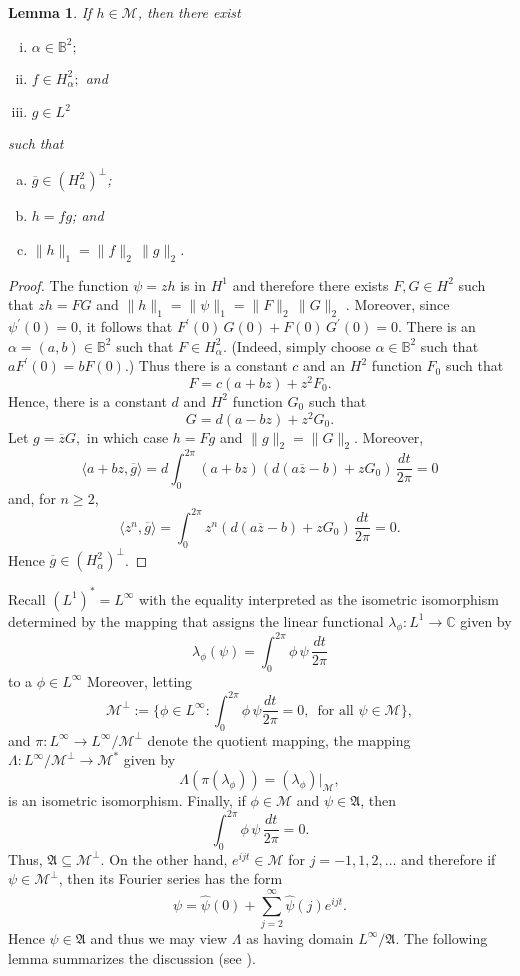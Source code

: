 \documentclass[12pt]{amsart}
\newtheorem{lemma}[theorem]{Lemma}
\theoremstyle{definition}
\theoremstyle{remark}
\numberwithin{equation}{section}
\begin{document}
\begin{lemma}
\label{lem:factor}
 If $h\in \mathscr{M}$, then there exist
\begin{enumerate}[(i)]
\item  $\alpha\in{\mathbb{B}^2};$
\item  $f\in H^2_\alpha;$ and 
\item  $g\in L^2$
\end{enumerate}
such that 
\begin{enumerate}[(a)]
 \item  $\overline{g} \in (H^2_\alpha)^\perp$;
 \item $h=fg$;  and 
 \item $\|h\|_1 =\|f\|_2\, \|g\|_2$.
\end{enumerate}
\end{lemma}

\begin{proof}
 The function $\psi=zh$ is in $H^1$ and therefore there exists $F,G\in H^2$ such that $zh=FG$ and $\|h\|_1 = \|\psi\|_1 = \|F\|_2\, \|G\|_2$ 
\cite[Corollary 6.27]{douglas}.
 Moreover, since $\psi^\prime(0)=0$, it follows that $F^\prime(0)\, G(0)+F(0)\, G^\prime(0)=0$. There is an $\alpha=(a,b)\in {\mathbb{B}^2}$ such that $F\in H^2_\alpha$.
(Indeed, simply choose $\alpha\in {\mathbb{B}^2}$ such that $a F^\prime(0)=bF(0)$.)  Thus there is a constant $c$ and an $H^2$ function $F_0$ such that
\[
 F=c(a+bz) + z^2 F_0.
\]
Hence, there is a constant $d$ and $H^2$ function $G_0$ such that
\[
G=d(a-bz)+z^2 G_0.
\]
Let $g=\overline{z} G,$ in which case $h=Fg$ and $\|g\|_2 =\|G\|_2$. Moreover,
\[
\langle a+bz,\overline{g}\rangle = d {\int_{0}^{2\pi}} (a+bz)\left ( d(a\overline{z}-b) + zG_0\right)\, {\frac{dt}{2\pi}} =0
\]
and, for $n\ge 2$, 
\[
\langle z^n, \overline{g}\rangle ={\int_{0}^{2\pi}} z^n \left(d(a\overline{z}-b)+zG_0\right)\, {\frac{dt}{2\pi}} =0.
\]
Hence $\overline{g}\in (H^2_\alpha)^\perp$.
\end{proof}

Recall   $(L^1)^*=L^\infty$  with the equality interpreted as the isometric isomorphism determined by the mapping that
assigns the linear functional $\lambda_\phi:L^1\to{\mathbb C}$ given by
\[
\lambda_\phi(\psi) = {\int_{0}^{2\pi}} \phi \, \psi \, {\frac{dt}{2\pi}}
\]
to a $\phi\in L^\infty$ 
Moreover, letting 
\[
\mathscr{M}^\perp :=\{\phi\in L^\infty: {\int_{0}^{2\pi}} \phi \, \psi {\frac{dt}{2\pi}} = 0, \, \mbox{ for all } \psi\in \mathscr{M}\},
\]
and $\pi:L^\infty \to L^\infty/\mathscr{M}^\perp$ denote the quotient mapping, 
the mapping $\Lambda:L^\infty/\mathscr{M}^\perp \to \mathscr{M}^*$ given by
\[
 \Lambda(\pi(\lambda_\phi)) = (\lambda_\phi)|_{\mathscr{M}},
\]
is an isometric isomorphism. Finally, if $\phi\in \mathscr{M}$ and $\psi\in {\mathfrak{A}}$, then
\[
 {\int_{0}^{2\pi}} \phi\, \psi\, {\frac{dt}{2\pi}} =0.
\]
Thus, ${\mathfrak{A}}{\subseteq} \mathscr{M}^\perp.$ On the other hand, $e^{ijt}\in \mathscr{M}$ for $j=-1,1,2,\dots$
and therefore if $\psi\in \mathscr{M}^\perp$, then its Fourier series has the form
\[
 \psi = \hat{\psi}(0) + \sum_{j=2}^\infty \hat{\psi}(j) e^{ijt}.
\]
Hence $\psi\in {\mathfrak{A}}$  and thus we may view $\Lambda$ as having domain $L^\infty/{\mathfrak{A}}$. The following lemma
summarizes the discussion (see \cite[page 88]{conway}).
\end{document}
